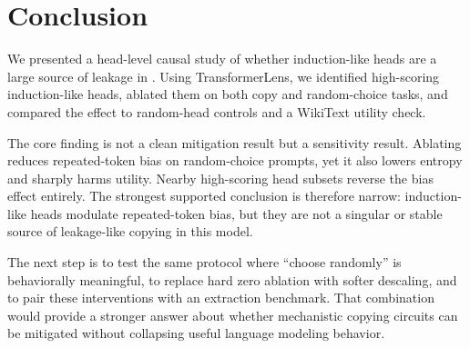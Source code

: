 \section{Conclusion}
\label{sec:conclusion}

We presented a head-level causal study of whether induction-like heads are a large source of leakage in \gptsmall. Using TransformerLens, we identified high-scoring induction-like heads, ablated them on both copy and random-choice tasks, and compared the effect to random-head controls and a WikiText utility check.

The core finding is not a clean mitigation result but a sensitivity result. Ablating \headpair reduces repeated-token bias on random-choice prompts, yet it also lowers entropy and sharply harms utility. Nearby high-scoring head subsets reverse the bias effect entirely. The strongest supported conclusion is therefore narrow: induction-like heads modulate repeated-token bias, but they are not a singular or stable source of leakage-like copying in this model.

The next step is to test the same protocol where ``choose randomly'' is behaviorally meaningful, to replace hard zero ablation with softer descaling, and to pair these interventions with an extraction benchmark. That combination would provide a stronger answer about whether mechanistic copying circuits can be mitigated without collapsing useful language modeling behavior.
